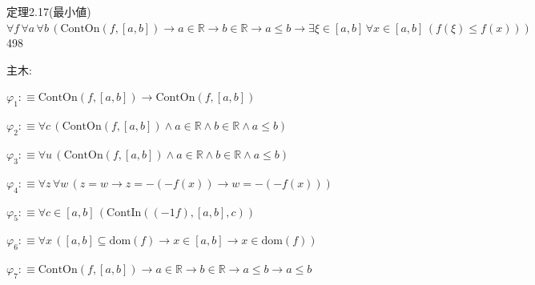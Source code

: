 \begin{fullproof}{定理2.17(最小値)}{$\forall f\,\forall a\,\forall b\,(\mathrm{ContOn}(f,[a,b]) \to a \in \mathbb{R} \to b \in \mathbb{R} \to a \leq b \to \exists \xi \in [a,b]\,\forall x \in [a,b]\,(f(\xi) \leq f(x)))$}{498}
\begin{ptree}
\noLine
{}
\noLine
{}
\end{ptree}
\noindent 主木:
\begin{ptree}
\noLine
{}
\end{ptree}
\begin{abbrevlist}
\item $\varphi_{1} :\equiv \mathrm{ContOn}(f,[a,b]) \to \mathrm{ContOn}(f,[a,b])$
\item $\varphi_{2} :\equiv \forall c\,(\mathrm{ContOn}(f,[a,b]) \land a \in \mathbb{R} \land b \in \mathbb{R} \land a \leq b)$
\item $\varphi_{3} :\equiv \forall u\,(\mathrm{ContOn}(f,[a,b]) \land a \in \mathbb{R} \land b \in \mathbb{R} \land a \leq b)$
\item $\varphi_{4} :\equiv \forall z\,\forall w\,(z = w \to z = -(-f(x)) \to w = -(-f(x)))$
\item $\varphi_{5} :\equiv \forall c \in [a,b]\,(\mathrm{ContIn}((-1 f),[a,b],c))$
\item $\varphi_{6} :\equiv \forall x\,([a,b] \subseteq \mathrm{dom}(f) \to x \in [a,b] \to x \in \mathrm{dom}(f))$
\item $\varphi_{7} :\equiv \mathrm{ContOn}(f,[a,b]) \to a \in \mathbb{R} \to b \in \mathbb{R} \to a \leq b \to a \leq b$

\end{abbrevlist}
\end{fullproof}
